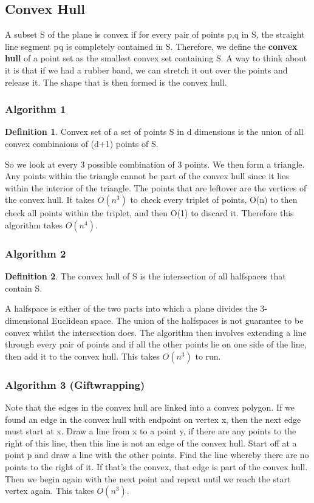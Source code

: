 \documentclass[11pt, oneside]{article}
\theoremstyle{definition}
\newtheorem{definition}{Definition}[section]
\begin{document}
\subsection{Convex Hull}
A subset S of the plane is convex if for every pair of points p,q in S, the straight line segment pq is completely contained in S. Therefore, we define the \textbf{convex hull} of a point set as the smallest convex set containing S. A way to think about it is that if we had a rubber band, we can stretch it out over the points and release it. The shape that is then formed is the convex hull.

\subsubsection{Algorithm 1}

\begin{definition}
  Convex set of a set of points S in d dimensions is the union of all convex combinaions of (d+1) points of S.
\end{definition}
So we look at every 3 possible combination of 3 points. We then form a triangle. Any points within the triangle cannot be part of the convex hull since it lies within the interior of the triangle. The points that are leftover are the vertices of the convex hull. It takes $O(n^3)$ to check every triplet of points, O(n) to then check all points within the triplet, and then O(1) to discard it. Therefore this algorithm takes $O(n^4)$.

\subsubsection{Algorithm 2}
\begin{definition}
  The convex hull of S is the intersection of all halfspaces that contain S.
\end{definition}
A halfspace is either of the two parts into which a plane divides the 3-dimensional Euclidean space. The union of the halfspaces is not guarantee to be convex whilst the intersection does. The algorithm then involves extending a line through every pair of points and if all the other points lie on one side of the line, then add it to the convex hull. This takes $O(n^3)$ to run.

\subsubsection{Algorithm 3 (Giftwrapping)}
Note that the edges in the convex hull are linked into a convex polygon. If we found an edge in the convex hull with endpoint on vertex x, then the next edge must start at x. Draw a line from x to a point y, if there are any points to the right of this line, then this line is not an edge of the convex hull. Start off at a point p and draw a line with the other points. Find the line whereby there are no points to the right of it. If that's the convex, that edge is part of the convex hull. Then we begin again with the next point and repeat until we reach the start vertex again. This takes $O(n^3)$.
\end{document}
